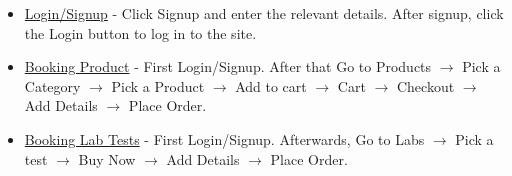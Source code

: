 \documentclass[12pt]{article}
\begin{document}
\begin{itemize}
    \item \underline{Login/Signup} - Click Signup and enter the relevant details. After signup, click the Login button to log in to the site.
    \item \underline{Booking Product} - First Login/Signup. After that Go to Products $\rightarrow$ Pick a Category $\rightarrow$ Pick a Product $\rightarrow$ Add to cart $\rightarrow$ Cart $\rightarrow$ Checkout $\rightarrow$ Add Details $\rightarrow$ Place Order.
    \item \underline{Booking Lab Tests} - First Login/Signup. Afterwards, Go to Labs $\rightarrow$ Pick a test $\rightarrow$ Buy Now $\rightarrow$ Add Details $\rightarrow$ Place Order.
    
\end{itemize}
\end{document}
